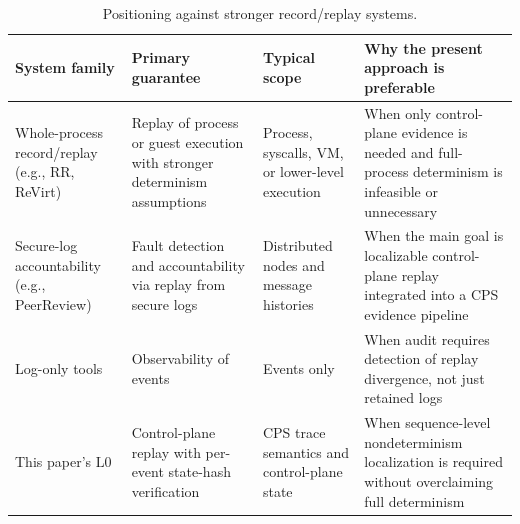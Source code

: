 \documentclass[11pt]{article}
\newcommand{\Lzero}{\ensuremath{\mathrm{L0}}}
\begin{document}
\begin{table}[H]
\centering
\caption{Positioning against stronger record/replay systems.}
\label{tab:related-systems}
\begin{tabular}{p{3.0cm}p{3.2cm}p{3.5cm}p{4.3cm}}
\toprule
System family & Primary guarantee & Typical scope & Why the present approach is preferable \\
\midrule
Whole-process record/replay (e.g., RR, ReVirt) & Replay of process or guest execution with stronger determinism assumptions & Process, syscalls, VM, or lower-level execution & When only control-plane evidence is needed and full-process determinism is infeasible or unnecessary \\
Secure-log accountability (e.g., PeerReview) & Fault detection and accountability via replay from secure logs & Distributed nodes and message histories & When the main goal is localizable control-plane replay integrated into a CPS evidence pipeline \\
Log-only tools & Observability of events & Events only & When audit requires detection of replay divergence, not just retained logs \\
This paper's \Lzero{} & Control-plane replay with per-event state-hash verification & CPS trace semantics and control-plane state & When sequence-level nondeterminism localization is required without overclaiming full determinism \\
\bottomrule
\end{tabular}
\end{table}
\end{document}
